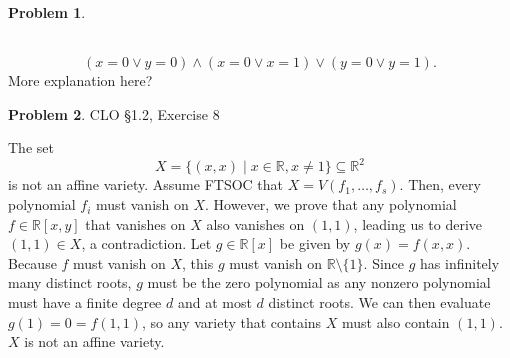 \documentclass[12pt]{amsart}
\theoremstyle{definition}
\newtheorem{prob}{Problem}
\begin{document}
\begin{flushleft}
\begin{prob}
\begin{itemize}
\\ 
\[(x = 0 \lor y=0)\land (x=0\lor x=1)\lor (y=0\lor y=1).\]
More explanation here?
\end{itemize}
\end{prob}
\bigskip 

\newpage{}
\begin{prob} CLO \S1.2, Exercise 8

The set 
\[ X = \{(x,x) \mid x \in \mathbb R, x \ne 1\} \subseteq \mathbb R^2 \]
is not an affine variety. Assume FTSOC that $X = V(f_1, \dots, f_s)$. Then, every polynomial $f_i$ must vanish on $X$. However, we prove that any polynomial $f \in \mathbb R[x,y]$ that vanishes on $X$ also vanishes on $(1,1)$, leading us to derive $(1,1)\in X$, a contradiction. Let $g \in \mathbb R[x]$ be given by $g(x)=f(x,x)$. Because $f$ must vanish on $X$, this $g$ must vanish on $\mathbb R \setminus \{1\}$. Since $g$ has infinitely many distinct roots, $g$ must be the zero polynomial as any nonzero polynomial must have a finite degree $d$ and at most $d$ distinct roots. We can then evaluate $g(1)=0=f(1,1)$, so any variety that contains $X$ must also contain $(1,1)$. $X$ is not an affine variety.
\end{prob}
\bigskip 


\end{flushleft}
\end{document}
